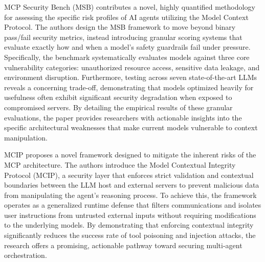 MCP Security Bench (MSB) \cite{zhang2025msb} contributes a novel, highly quantified methodology for assessing the specific risk profiles of AI agents utilizing the Model Context Protocol. The authors design the MSB framework to move beyond binary pass/fail security metrics, instead introducing granular scoring systems that evaluate exactly how and when a model's safety guardrails fail under pressure. Specifically, the benchmark systematically evaluates models against three core vulnerability categories: unauthorized resource access, sensitive data leakage, and environment disruption. Furthermore, testing across seven state-of-the-art LLMs reveals a concerning trade-off, demonstrating that models optimized heavily for usefulness often exhibit significant security degradation when exposed to compromised servers. By detailing the empirical results of these granular evaluations, the paper provides researchers with actionable insights into the specific architectural weaknesses that make current models vulnerable to context manipulation.

MCIP \cite{jing2025mcip} proposes a novel framework designed to mitigate the inherent risks of the MCP architecture. The authors introduce the Model Contextual Integrity Protocol (MCIP), a security layer that enforces strict validation and contextual boundaries between the LLM host and external servers to prevent malicious data from manipulating the agent’s reasoning process. To achieve this, the framework operates as a generalized runtime defense that filters communications and isolates user instructions from untrusted external inputs without requiring modifications to the underlying models. By demonstrating that enforcing contextual integrity significantly reduces the success rate of tool poisoning and injection attacks, the research offers a promising, actionable pathway toward securing multi-agent orchestration.
